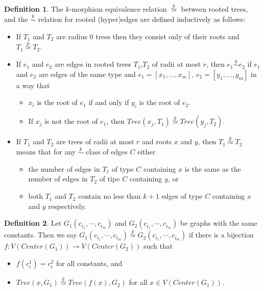\documentclass[11pt,notitlepage]{report}
\theoremstyle{definition}
\newtheorem{definition}{Definition}[chapter]
\newcommand{\clist}{c_{i_1}, \cdots, c_{i_m}}
\newcommand{\morph}[1]{\stackrel{#1}{\simeq}}
\begin{document}
\begin{definition} 
	The $k$-morphism equivalence relation $\morph{k}$ between rooted trees,
	and the $\stackrel{k}{\sim}$ relation for rooted (hyper)edges are defined inductively as follows:
	\begin{itemize}
		\item If $T_1$ and $T_2$ are radius $0$ trees then they consist only of
		their roots and $T_1\morph{k} T_2$. 
		\item 
		If $e_1$ and $e_2$ are edges in rooted trees $T_1$,$T_2$ of radii at most $r$,
		then $e_1\stackrel{k}{\sim} e_2$ if $e_1$ and $e_2$ are edges of the same 
		type and $e_1=[x_1,\dots, x_m]$, $e_2=[y_1,\dots,y_m]$ in a way that
		\begin{itemize}
			\item $x_i$ is the root of $e_1$ if and only if $y_i$ is the root of $e_2$.
			\item If $x_j$ is not the root of $e_1$, then
			$Tree(x_j, T_1)\morph{k} Tree(y_j, T_2)$.
		\end{itemize}
		\item If $T_1$ and $T_2$ are trees of radii at most $r$ and roots $x$ and $y$,
		then $T_1\morph{k} T_2$ means that for any $\stackrel{k}{\sim}$ class
		of edges $C$ either
		\begin{itemize}
			\item the number of edges in $T_1$ of type $C$ containing $x$ is the same
			as the number of edges in $T_2$ of tipe $C$ containing $y$, or
			\item both $T_1$ and $T_2$ contain no less than $k+1$ edges of type $C$
			containing $x$ and $y$ respectively. 
		\end{itemize}
		 
	\end{itemize}
	
\end{definition}

\begin{definition} 
	Let $G_1(\clist)$ and $G_2(\clist)$ be graphs with the same constants. Then
	we say $G_1(\clist)\morph{k}G_2(\clist)$ if there is a bijection 
	$f:V(Center(G_1))\rightarrow V(Center(G_2))$ such that
	\begin{itemize}
		\item $f(c^1_i)=c^2_i$ for all constants, and
		\item $Tree(x,G_1)\morph{k} Tree(f(x),G_2)$ for all $x\in V(Center(G_1))$.
	\end{itemize}
\end{definition}
\end{document}
